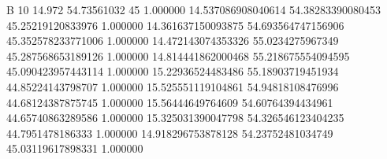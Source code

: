 


B		10
14.972	54.73561032	45	1.000000
14.537086908040614	54.38283390080453	45.25219120833976	1.000000
14.361637150093875	54.693564747156906	45.352578233771006	1.000000
14.472143074353326	55.0234275967349	45.287568653189126	1.000000
14.814441862000468	55.218675554094595	45.090423957443114	1.000000
15.22936524483486	55.18903719451934	44.85224143798707	1.000000
15.525551119104861	54.94818108476996	44.68124387875745	1.000000
15.56444649764609	54.60764394434961	44.65740863289586	1.000000
15.325031390047798	54.326546123404235	44.7951478186333	1.000000
14.918296753878128	54.23752481034749	45.03119617898331	1.000000
